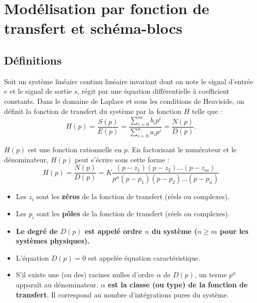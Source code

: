 \section{Modélisation par fonction de transfert et schéma-blocs}

\subsection{Définitions}

\begin{defi}
Soit un système linéaire continu linéaire invariant dont on note le signal d'entrée $e$ et le signal de sortie $s$, régit par une équation différentielle à coefficient constants. Dans le domaine de Laplace et sous les conditions de Heaviside, on définit la fonction de transfert du système par la fonction $H$ telle que : 
$$
H(p)
=\dfrac{S(p)}{E(p)} 
= \dfrac{\sum\limits_{i=0}^{m} b_i p^i}{\sum\limits_{i=0}^{n} a_i p^i}
=\dfrac{N(p)}{D(p)}.
$$
 \end{defi}





\begin{defi}
$H(p)$ est une fonction rationnelle en $p$. En factorisant le numérateur et le
dénominateur, $H(p)$ peut s'écrire sous cette forme :
$$
H(p) = \dfrac{N(p)}{D(p)} =
K \dfrac{\left(p-z_1 \right)\left(p-z_2 \right)...\left(p-z_m \right)}{
p^{\alpha} \left(p-p_1 \right)\left(p-p_2 \right)...\left(p-p_n \right)}
$$

 \begin{itemize}
 \item Les $z_i$ sont les \textbf{zéros} de la fonction de transfert (réels ou
complexes).
\item Les $p_i$ sont les \textbf{pôles} de la fonction de transfert (réels ou
complexes).
\item \textbf{Le degré de $D(p)$ est appelé ordre $n$ du système ($n\geq m$ pour les
systèmes physiques).}
\item L'équation $D(p)=0$ est appelée équation caractéristique.
\item S'il existe une (ou des) racines nulles d'ordre $\alpha$ de $D(p)$, un
terme $p^\alpha$ apparaît au dénominateur. \textbf{$\alpha$ est la classe (ou type) de
la fonction de transfert}. Il correspond au nombre d'intégrations pures du
système.
\end{itemize}
\end{defi}


